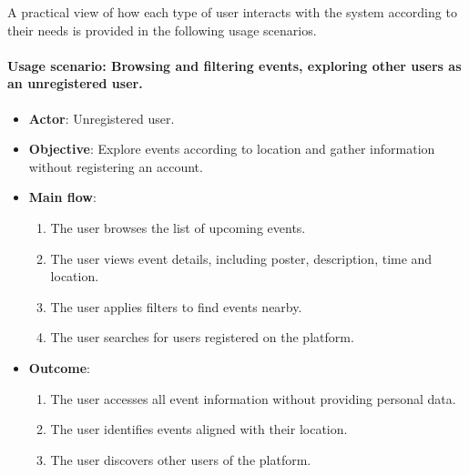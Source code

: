 A practical view of how each type of user interacts with the system according to their needs is provided in the following usage scenarios.

\paragraph{Usage scenario: Browsing and filtering events, exploring other users as an unregistered user.}
\begin{itemize}
  \item \textbf{Actor}: Unregistered user.
  \item \textbf{Objective}: Explore events according to location and gather information without registering an account.
  \item \textbf{Main flow}:
    \begin{enumerate}
      \item The user browses the list of upcoming events.
      \item The user views event details, including poster, description, time and location.
      \item The user applies filters to find events nearby.
      \item The user searches for users registered on the platform.
    \end{enumerate}
  \item \textbf{Outcome}:
    \begin{enumerate}
      \item The user accesses all event information without providing personal data.
      \item The user identifies events aligned with their location.
      \item The user discovers other users of the platform.
    \end{enumerate}
\end{itemize}

